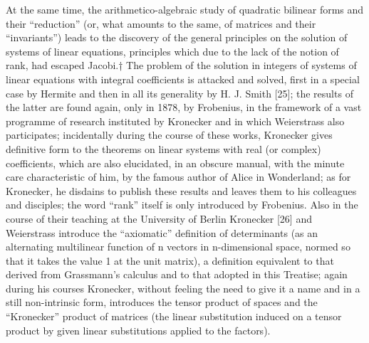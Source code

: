 At the same time, the arithmetico-algebraic study of quadratic bilinear forms and their ``reduction'' (or, what amounts to the same, of matrices and their ``invariants'') leads to the discovery of the general principles on the solution of systems of linear equations, principles which due to the lack of the notion of rank, had escaped Jacobi.† The problem of the solution in integers of systems of linear equations with integral coefficients is attacked and solved, first in a special case by Hermite and then in all its generality by H. J. Smith {[}25{]}; the results of the latter are found again, only in 1878, by Frobenius, in the framework of a vast programme of research instituted by Kronecker and in which Weierstrass also participates; incidentally during the course of these works, Kronecker gives definitive form to the theorems on linear systems with real (or complex) coefficients, which are also elucidated, in an obscure manual, with the minute care characteristic of him, by the famous author of Alice in Wonderland; as for Kronecker, he disdains to publish these results and leaves them to his colleagues and disciples; the word ``rank'' itself is only introduced by Frobenius. Also in the course of their teaching at the University of Berlin Kronecker {[}26{]} and Weierstrass introduce the ``axiomatic'' definition of determinants (as an alternating multilinear function of n vectors in n-dimensional space, normed so that it takes the value 1 at the unit matrix), a definition equivalent to that derived from Grassmann's calculus and to that adopted in this Treatise; again during his courses Kronecker, without feeling the need to give it a name and in a still non-intrinsic form, introduces the tensor product of spaces and the ``Kronecker'' product of matrices (the linear substitution induced on a tensor product by given linear substitutions applied to the factors).

